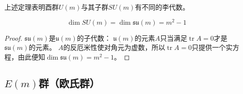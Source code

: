 上述定理表明酉群$U(m)$与其子群$SU(m)$有不同的李代数。

\begin{theorem}
    $$\dim SU(m) = \dim\mathfrak{su}(m) = m^2 - 1$$
\end{theorem}

\begin{proof}
    $\mathfrak{su}(m)$是$\mathfrak{u}(m)$的子代数：
    $\mathfrak{u}(m)$的元素$A$只当满足$\operatorname{tr}A = 0$才是$\mathfrak{su}(m)$的元素。
    $A$的反厄米性使对角元为虚数，所以$\operatorname{tr}A = 0$只提供一个实方程，由此便知$\dim\mathfrak{su}(m) = m^2 - 1$。
\end{proof}

\subsection{$E(m)$群（欧氏群）}

